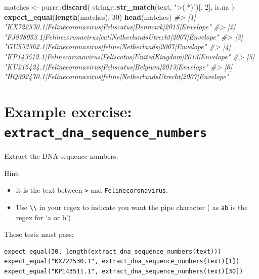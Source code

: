 \documentclass[]{book}
\newenvironment{Shaded}{}{}
\newcommand{\CommentTok}[1]{\textcolor[rgb]{0.38,0.63,0.69}{\textit{#1}}}
\newcommand{\DecValTok}[1]{\textcolor[rgb]{0.25,0.63,0.44}{#1}}
\newcommand{\KeywordTok}[1]{\textcolor[rgb]{0.00,0.44,0.13}{\textbf{#1}}}
\newcommand{\NormalTok}[1]{#1}
\newcommand{\OperatorTok}[1]{\textcolor[rgb]{0.40,0.40,0.40}{#1}}
\newcommand{\StringTok}[1]{\textcolor[rgb]{0.25,0.44,0.63}{#1}}
\providecommand{\tightlist}{%
  \setlength{\itemsep}{0pt}\setlength{\parskip}{0pt}}
\begin{document}
\begin{Shaded}
\begin{Highlighting}[]
\NormalTok{matches <-}\StringTok{ }\NormalTok{purrr}\OperatorTok{::}\KeywordTok{discard}\NormalTok{(}
\NormalTok{  stringr}\OperatorTok{::}\KeywordTok{str_match}\NormalTok{(text, }\StringTok{">(.*)"}\NormalTok{)[, }\DecValTok{2}\NormalTok{], }
\NormalTok{  is.na}
\NormalTok{)}
\KeywordTok{expect_equal}\NormalTok{(}\KeywordTok{length}\NormalTok{(matches), }\DecValTok{30}\NormalTok{)}
\KeywordTok{head}\NormalTok{(matches)}
\CommentTok{#> [1] "KX722530.1|Felinecoronavirus|Feliscatus|Denmark|2015|Envelope"       }
\CommentTok{#> [2] "FJ938053.1|Felinecoronavirus|cat|NetherlandsUtrecht|2007|Envelope"   }
\CommentTok{#> [3] "GU553362.1|Felinecoronavirus|feline|Netherlands|2007|Envelope"       }
\CommentTok{#> [4] "KP143512.1|Felinecoronavirus|Feliscatus|UnitedKingdom|2013|Envelope" }
\CommentTok{#> [5] "KU215424.1|Felinecoronavirus|Feliscatus|Belgium|2013|Envelope"       }
\CommentTok{#> [6] "HQ392470.1|Felinecoronavirus|feline|NetherlandsUtrecht|2007|Envelope"}
\end{Highlighting}
\end{Shaded}

\hypertarget{example-exercise-extract_dna_sequence_numbers}{%
\section{\texorpdfstring{Example exercise: \texttt{extract\_dna\_sequence\_numbers}}{Example exercise: extract\_dna\_sequence\_numbers}}\label{example-exercise-extract_dna_sequence_numbers}}

Extract the DNA sequence numbers.

Hint:

\begin{itemize}
\tightlist
\item
  it is the text between \texttt{\textgreater{}} and \texttt{\textbar{}Felinecoronavirus}.
\item
  Use \texttt{\textbackslash{}\textbackslash{}\textbar{}} in your regex to indicate you want the pipe character (
  as \texttt{a\textbar{}b} is the regex for `a or b')
\end{itemize}

These tests must pass:

\begin{verbatim}
expect_equal(30, length(extract_dna_sequence_numbers(text)))
expect_equal("KX722530.1", extract_dna_sequence_numbers(text)[1])
expect_equal("KP143511.1", extract_dna_sequence_numbers(text)[30])
\end{verbatim}
\end{document}
